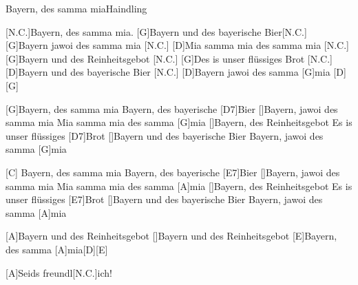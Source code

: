 \documentclass[../main.tex]{subfiles}
\begin{document}
\begin{song}[3]{Bayern, des samma mia}{Haindling}{}    

[N.C.]Bayern, des samma mia.\hh{}
[G]Bayern und des bayerische Bier[N.C.]{\hh} 
[G]Bayern jawoi des samma mia [N.C.]{\hh} 
[D]Mia samma mia des samma mia [N.C.]{\hh} 
[G]Bayern und des Reinheitsgebot [N.C.]{\hh} 
[G]Des is unser flüssiges Brot [N.C.]{\hh} 
[D]Bayern und des bayerische Bier [N.C.]{\hh} 
[D]Bayern jawoi des samma [G]mia \hh{}[D]{\hh}[G]{\hh}
 
[G]Bayern, des samma mia
Bayern, des bayerische [D7]Bier
[]Bayern, jawoi des samma mia
Mia samma mia des samma [G]mia
[]Bayern, des Reinheitsgebot
Es is unser flüssiges [D7]Brot
[]Bayern und des bayerische Bier
Bayern, jawoi des samma [G]mia

[C] \hh [G] \hh [C] \hh 
[A]Bayern, des samma mia
Bayern, des bayerische [E7]Bier
[]Bayern, jawoi des samma mia
Mia samma mia des samma [A]mia
[]Bayern, des Reinheitsgebot
Es is unser flüssiges [E7]Brot
[]Bayern und des bayerische Bier
Bayern, jawoi des samma [A]mia
 
[A]Bayern und des Reinheitsgebot
[]Bayern und des Reinheitsgebot
[E]Bayern, des samma [A]mia[D]{\hh}[E]{\hh}
 
[A]Seids freundl[N.C.]ich!
\end{song}
\end{document}
